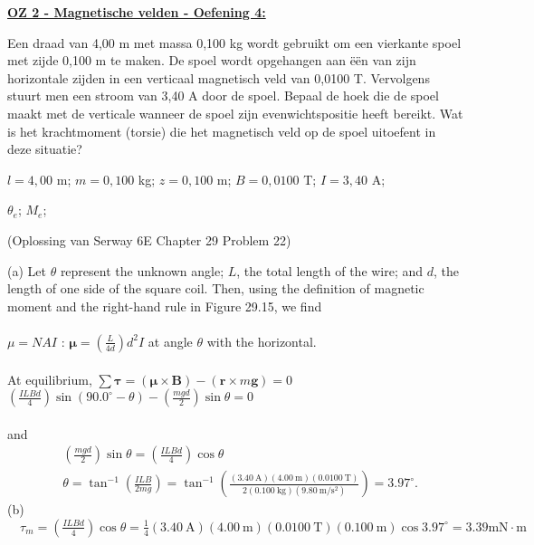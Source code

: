 \textbf{\underline{OZ 2 - Magnetische velden - Oefening 4:}}
\vspace{0.5cm}

Een draad van 4,00 m met massa 0,100 kg wordt gebruikt om een vierkante spoel met zijde 0,100 m te maken. De spoel wordt opgehangen aan ëën van zijn horizontale zijden in een verticaal magnetisch veld van 0,0100 T. Vervolgens stuurt men een stroom van 3,40 A door de spoel. Bepaal de hoek die de spoel maakt met de verticale wanneer de spoel zijn evenwichtspositie heeft bereikt. Wat is het krachtmoment (torsie) die het magnetisch veld op de spoel uitoefent in deze situatie?

\begin{description}[labelwidth=1.5cm, leftmargin=!]
    \item[Geg. :]   $ l = 4,00 $ m; $ m = 0,100 $ kg; $ z = 0,100 $ m; $ B = 0,0100 $ T; $ I = 3,40 $ A;
    \item[Gevr. :]  $ \theta_e $; $ M_e $;
    \item[Opl. :] 
    (Oplossing van Serway 6E Chapter 29 Problem 22)

(a) Let $\theta$ represent the unknown angle; $L$, the total length of the wire; and $d$, the length of one side of the square coil. Then, using the definition of magnetic moment and the right-hand rule in Figure 29.15, we find
\\\\
$\mu=N A I$ :
$\boldsymbol{\mu}=\left(\frac{L}{4 d}\right) d^2 I$ at angle $\theta$ with the horizontal.
\\\\
At equilibrium,
$\sum \boldsymbol{\tau}=(\boldsymbol{\mu} \times \mathbf{B})-(\mathbf{r} \times m \mathbf{g})=0$
\\
$\left(\frac{I L B d}{4}\right) \sin \left(90.0^{\circ}-\theta\right)-\left(\frac{m g d}{2}\right) \sin \theta=0$
\\\\
and
$$
\begin{aligned}
& \left(\frac{m g d}{2}\right) \sin \theta=\left(\frac{I L B d}{4}\right) \cos \theta \\
& \theta=\tan ^{-1}\left(\frac{I L B}{2 m g}\right)=\tan ^{-1}\left(\frac{(3.40 \mathrm{~A})(4.00 \mathrm{~m})(0.0100 \mathrm{~T})}{2(0.100 \mathrm{~kg})\left(9.80 \mathrm{~m} / \mathrm{s}^2\right)}\right)=3.97^{\circ} .
\end{aligned}
$$
(b) $\quad \tau_m=\left(\frac{I L B d}{4}\right) \cos \theta=\frac{1}{4}(3.40 \mathrm{~A})(4.00 \mathrm{~m})(0.0100 \mathrm{~T})(0.100 \mathrm{~m}) \cos 3.97^{\circ}=3.39 \mathrm{mN} \cdot \mathrm{m}$
\end{description}

\vspace{1cm}
